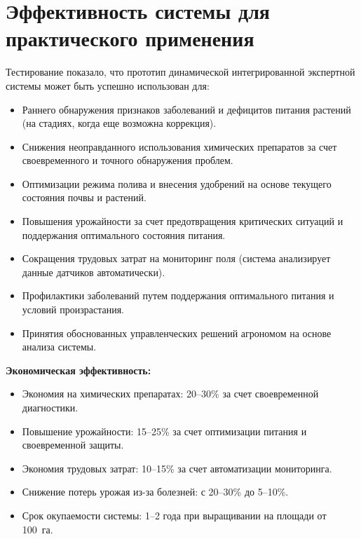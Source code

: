 \section{Эффективность системы для практического применения}

Тестирование показало, что прототип динамической интегрированной экспертной системы может быть успешно использован для:
\begin{itemize}
    \item Раннего обнаружения признаков заболеваний и дефицитов питания растений (на стадиях, когда еще возможна коррекция).
    \item Снижения неоправданного использования химических препаратов за счет своевременного и точного обнаружения проблем.
    \item Оптимизации режима полива и внесения удобрений на основе текущего состояния почвы и растений.
    \item Повышения урожайности за счет предотвращения критических ситуаций и поддержания оптимального состояния питания.
    \item Сокращения трудовых затрат на мониторинг поля (система анализирует данные датчиков автоматически).
    \item Профилактики заболеваний путем поддержания оптимального питания и условий произрастания.
    \item Принятия обоснованных управленческих решений агрономом на основе анализа системы.
\end{itemize}

\textbf{Экономическая эффективность:}
\begin{itemize}
    \item Экономия на химических препаратах: 20--30\% за счет своевременной диагностики.
    \item Повышение урожайности: 15--25\% за счет оптимизации питания и своевременной защиты.
    \item Экономия трудовых затрат: 10--15\% за счет автоматизации мониторинга.
    \item Снижение потерь урожая из-за болезней: с 20--30\% до 5--10\%.
    \item Срок окупаемости системы: \num{1}--\num{2} года при выращивании на площади от \SI{100}{га}.
\end{itemize}

